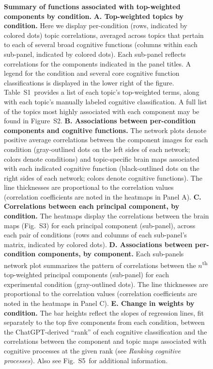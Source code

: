 \documentclass[english, 11pt]{article}
\newcommand{\topTerms}{S2}
\newcommand{\componentBrains}{S3}
\newcommand{\neurosynthFull}{S5}
\newcommand{\topics}{S1}
\begin{document}
\begin{figure}[tp]
\caption{\textbf{Summary of functions associated with top-weighted components
by condition.} \textbf{A. Top-weighted topics by condition.} Here we display
per-condition (rows, indicated by colored dots) topic correlations, averaged
across topics that pertain to each of several broad cognitive functions
(columns within each sub-panel, indicated by colored dots). Each sub-panel
reflects correlations for the components indicated in the panel titles. A
legend for the condition and several core cognitive function classifications is
displayed in the lower right of the figure. Table~\topics~provides a list of
each topic's top-weighted terms, along with each topic's manually labeled
cognitive classification. A full list of the topics most highly associated with
each component may be found in Figure~\topTerms. \textbf{B. Associations
between per-condition components and cognitive functions.} The network plots
denote positive average correlations between the component images for each
condition (gray-outlined dots on the left sides of each network; colors denote
conditions) and topic-specific brain maps associated with each indicated
cognitive function (black-outlined dots on the right sides of each network;
colors denote cognitive functions). The line thicknesses are proportional to
the correlation values (correlation coefficients are noted in the heatmaps in
Panel A). \textbf{C. Correlations between each principal component, by
condition.} The heatmaps display the correlations between the brain maps
(Fig.~\componentBrains) for each principal component (sub-panel), across each
pair of conditions (rows and columns of each sub-panel's matrix, indicated by
colored dots). \textbf{D. Associations between per-condition components, by
component.} Each sub-panels network plot summarizes the pattern of correlations
between the $n$\textsuperscript{th} top-weighted principal components
(sub-panel) for each experimental condition (gray-outlined dots). The line
thicknesses are proportional to the correlation values (correlation
coefficients are noted in the heatmaps in Panel C). \textbf{E. Change in
weights by condition.} The bar heights reflect the slopes of regression lines,
fit separately to the top five components from each condition, between the
ChatGPT-derived ``rank'' of each cognitive classification and the correlations
between the component and topic maps associated with cognitive processes at the
given rank (see \textit{Ranking cognitive processes}).  Also see
Fig.~\neurosynthFull~for additional information.}

\label{fig:neurosynth-summary}
\end{figure}
\end{document}
